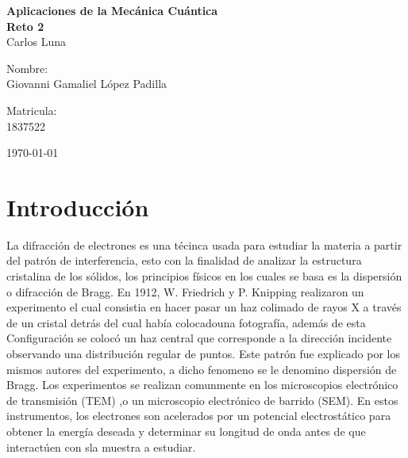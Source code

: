 \documentclass[reprint,amsmath,amssymb,aps,]{revtex4-2}
\begin{document}
\begin{titlepage}
\begin{center}
\begin{large}
\vspace{1cm}
\large{\textbf{Aplicaciones de la Mecánica Cuántica}}\vspace{1.5cm}\\
\textbf{Reto 2}\\
Carlos Luna\\
\end{large}
\vspace{3.5cm}
\begin{minipage}{0.6\linewidth}
\vspace{0.5cm}
\changefontsizes{14pt}
Nombre:\\
Giovanni Gamaliel López Padilla\\
\end{minipage}
\begin{minipage}{0.2\linewidth}
\changefontsizes{14pt}
Matricula:\\
1837522\\
\end{minipage}
\end{center}
\vspace{4cm}
\begin{flushright}
\today
\end{flushright}
\pagebreak
\end{titlepage}
\maketitle
\section{Introducción}
La difracción de electrones es una t\'ecinca usada para estudiar la 
materia a partir del patr\'on  de interferencia, esto con la finalidad de 
analizar la estructura cristalina de los s\'olidos, los principios físicos en los cuales se basa es la 
dispersión o difracción de Bragg. En 1912, W. Friedrich y P. Knipping realizaron un experimento el cual consistia en
hacer pasar un haz colimado de rayos X a través de un cristal detrás del cual había colocadouna fotografía, además de esta Configuración
se colocó un haz central que corresponde a la dirección incidente observando una distribución regular de puntos. Este patrón fue explicado por los mismos autores
del experimento, a dicho fenomeno se le denomino dispersión de Bragg. Los experimentos se realizan comunmente en los microscopios electrónico de transmisión (TEM)
,o un microscopio electrónico de barrido (SEM). En estos instrumentos, los electrones son acelerados por un potencial electrostático para obtener la energía deseada
y determinar su longitud de onda antes de que interactúen con sla muestra a estudiar. 
\end{document}
